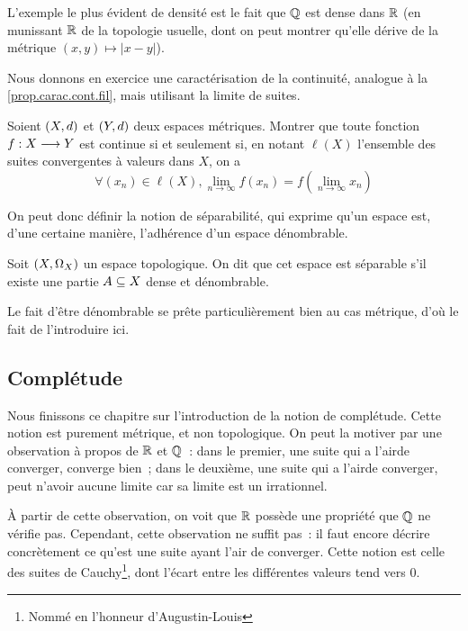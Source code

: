 \begin{example}
  L'exemple le plus évident de densité est le fait que $\mathbb Q$ est dense
  dans $\mathbb R$ (en munissant $\mathbb R$ de la topologie usuelle, dont on
  peut montrer qu'elle dérive de la métrique $(x,y)\mapsto |x-y|$).
\end{example}

\noindent
Nous donnons en exercice une caractérisation de la continuité, analogue à la
\cref{prop.carac.cont.fil}, mais utilisant la limite de suites.

\begin{exercise}\label{exo.carac.cont.suit}
  Soient $(X,d)$ et $(Y,d)$ deux espaces métriques. Montrer que
  toute fonction $f : \displaystyle X \longrightarrow Y$ est continue si et seulement si, en
  notant $\ell(X)$ l'ensemble des suites convergentes à valeurs dans $X$, on a
  \[\forall (x_n) \in \ell(X),
  \lim_{n \to \infty} f(x_n) = f\left(\lim_{n\to\infty} x_n\right)\]
\end{exercise}

On peut donc définir la notion de séparabilité, qui exprime qu'un espace est,
d'une certaine manière, l'adhérence d'un espace dénombrable.

\begin{definition}
  Soit $(X,\Omega_{X})$ un espace topologique. On dit que cet espace est
  séparable s'il existe une partie $A\subseteq X$ dense et dénombrable.
\end{definition}

Le fait d'être dénombrable se prête particulièrement bien au cas métrique,
d'où le fait de l'introduire ici.

\subsection{Complétude}

Nous finissons ce chapitre sur l'introduction de la notion de complétude. Cette
notion est purement métrique, et non topologique. On peut la motiver par une
observation à propos de $\mathbb R$ et $\mathbb Q$~: dans le premier, une
suite qui \og a l'air\fg de converger, converge bien~; dans le deuxième,
une suite qui \og a l'air\fg de converger, peut n'avoir aucune limite car sa
limite est un irrationnel.

\`A partir de cette observation, on voit que $\mathbb R$ possède une propriété que
$\mathbb Q$ ne vérifie pas. Cependant, cette observation ne suffit pas~: il faut
encore décrire concrètement ce qu'est une suite ayant l'air de converger. Cette
notion est celle des suites de Cauchy\footnote{Nommé en l'honneur
d'Augustin-Louis }, dont l'écart entre les différentes
valeurs tend vers $0$.

